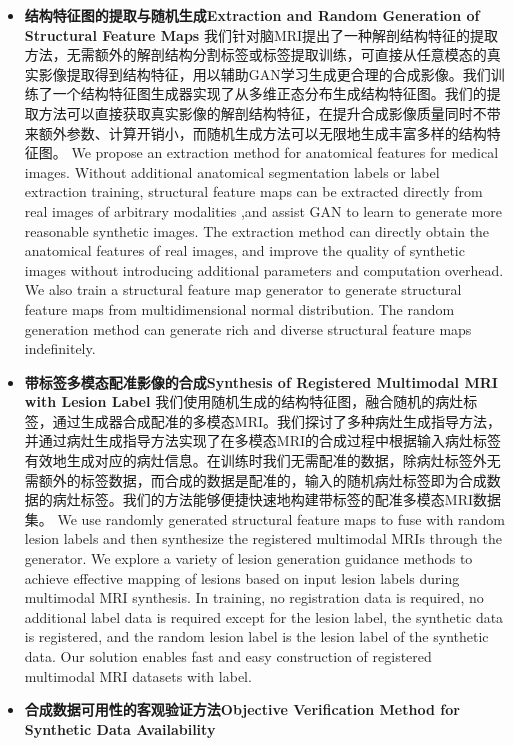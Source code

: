 \documentclass[letterpaper]{article} %
\begin{document}
\begin{itemize}
	\item \textbf{结构特征图的提取与随机生成Extraction and Random Generation of Structural Feature Maps}
	我们针对脑MRI提出了一种解剖结构特征的提取方法，无需额外的解剖结构分割标签或标签提取训练，可直接从任意模态的真实影像提取得到结构特征，用以辅助GAN学习生成更合理的合成影像。我们训练了一个结构特征图生成器实现了从多维正态分布生成结构特征图。我们的提取方法可以直接获取真实影像的解剖结构特征，在提升合成影像质量同时不带来额外参数、计算开销小，而随机生成方法可以无限地生成丰富多样的结构特征图。
	We propose an extraction method for anatomical features for medical images. Without additional anatomical segmentation labels or label extraction training, structural feature maps can be extracted directly from real images of arbitrary modalities ,and assist GAN to learn to generate more reasonable synthetic images. The extraction method can directly obtain the anatomical features of real images, and improve the quality of synthetic images without introducing additional parameters and computation overhead. We also train a structural feature map generator to generate structural feature maps from multidimensional normal distribution. The random generation method can generate rich and diverse structural feature maps indefinitely.
	\item \textbf{带标签多模态配准影像的合成Synthesis of Registered Multimodal MRI with Lesion Label}
	我们使用随机生成的结构特征图，融合随机的病灶标签，通过生成器合成配准的多模态MRI。我们探讨了多种病灶生成指导方法，并通过病灶生成指导方法实现了在多模态MRI的合成过程中根据输入病灶标签有效地生成对应的病灶信息。在训练时我们无需配准的数据，除病灶标签外无需额外的标签数据，而合成的数据是配准的，输入的随机病灶标签即为合成数据的病灶标签。我们的方法能够便捷快速地构建带标签的配准多模态MRI数据集。
	We use randomly generated structural feature maps to fuse with random lesion labels and then synthesize the registered multimodal MRIs through the generator. We explore a variety of lesion generation guidance methods to achieve effective mapping of lesions based on input lesion labels during multimodal MRI synthesis. In training, no registration data is required, no additional label data is required except for the lesion label, the synthetic data is registered, and the random lesion label is the lesion label of the synthetic data. Our solution enables fast and easy construction of registered multimodal MRI datasets with label.
	\item \textbf{合成数据可用性的客观验证方法Objective Verification Method for Synthetic Data Availability}

\end{itemize}
\end{document}
